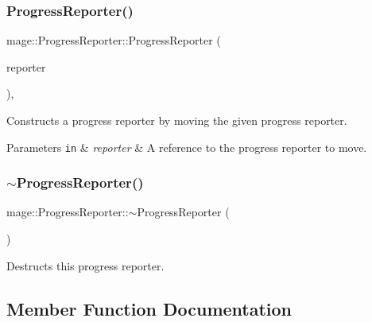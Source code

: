 \subsubsection{\texorpdfstring{Progress\+Reporter()}{ProgressReporter()}\hspace{0.1cm}{\footnotesize\ttfamily [3/3]}}
{\footnotesize\ttfamily mage\+::\+Progress\+Reporter\+::\+Progress\+Reporter (\begin{DoxyParamCaption}\item[{\hyperlink{classmage_1_1_progress_reporter}{Progress\+Reporter} \&\&}]{reporter }\end{DoxyParamCaption})\hspace{0.3cm}{\ttfamily [default]}, {\ttfamily [noexcept]}}

Constructs a progress reporter by moving the given progress reporter.


\begin{DoxyParams}[1]{Parameters}
\mbox{\tt in}  & {\em reporter} & A reference to the progress reporter to move. \\
\hline
\end{DoxyParams}
\hypertarget{classmage_1_1_progress_reporter_aa543239c6dd4474a77cf4cf6904c1b26}{}\label{classmage_1_1_progress_reporter_aa543239c6dd4474a77cf4cf6904c1b26} 
\subsubsection{\texorpdfstring{$\sim$\+Progress\+Reporter()}{~ProgressReporter()}}
{\footnotesize\ttfamily mage\+::\+Progress\+Reporter\+::$\sim$\+Progress\+Reporter (\begin{DoxyParamCaption}{ }\end{DoxyParamCaption})\hspace{0.3cm}{\ttfamily [default]}}

Destructs this progress reporter. 

\subsection{Member Function Documentation}
\hypertarget{classmage_1_1_progress_reporter_a11d758647ac2082bc296ab53a7454eaa}{}\label{classmage_1_1_progress_reporter_a11d758647ac2082bc296ab53a7454eaa} 
